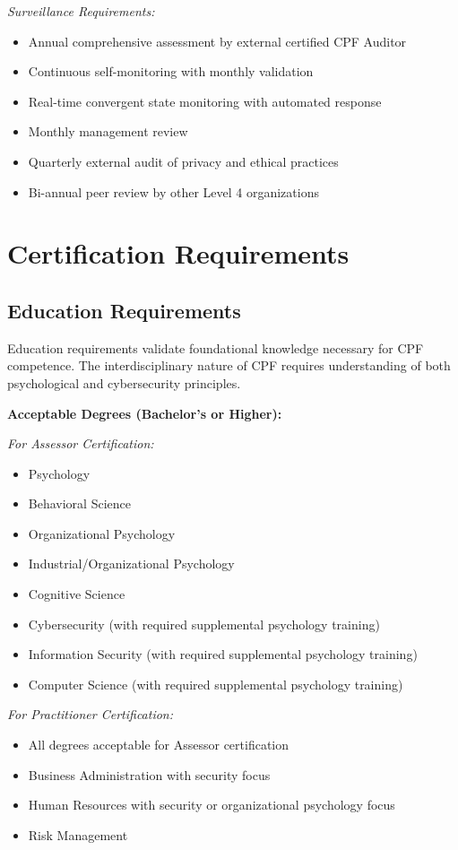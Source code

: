 \documentclass[11pt,a4paper]{article}
\begin{document}
\textit{Surveillance Requirements:}
\begin{itemize}
\item Annual comprehensive assessment by external certified CPF Auditor
\item Continuous self-monitoring with monthly validation
\item Real-time convergent state monitoring with automated response
\item Monthly management review
\item Quarterly external audit of privacy and ethical practices
\item Bi-annual peer review by other Level 4 organizations
\end{itemize}

\section{Certification Requirements}

\subsection{Education Requirements}

Education requirements validate foundational knowledge necessary for CPF competence. The interdisciplinary nature of CPF requires understanding of both psychological and cybersecurity principles.

\textbf{Acceptable Degrees (Bachelor's or Higher):}

\textit{For Assessor Certification:}
\begin{itemize}
\item Psychology
\item Behavioral Science
\item Organizational Psychology
\item Industrial/Organizational Psychology
\item Cognitive Science
\item Cybersecurity (with required supplemental psychology training)
\item Information Security (with required supplemental psychology training)
\item Computer Science (with required supplemental psychology training)
\end{itemize}

\textit{For Practitioner Certification:}
\begin{itemize}
\item All degrees acceptable for Assessor certification
\item Business Administration with security focus
\item Human Resources with security or organizational psychology focus
\item Risk Management
\end{itemize}
\end{document}
